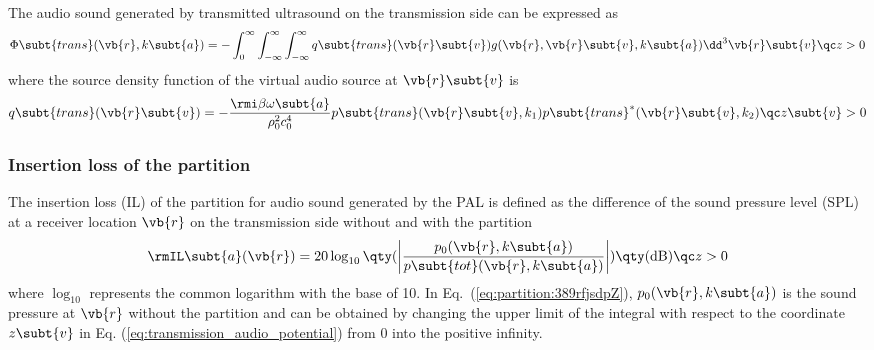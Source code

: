 The audio sound generated by transmitted ultrasound
on the transmission side can be expressed as
\begin{equation}
    \Phi\subt{trans}(\vb{r},k\subt{a})
    =-
    \int_0^\infty \int_{-\infty}^\infty \int_{-\infty}^\infty
    q\subt{trans}(\vb{r}\subt{v})
    g(\vb{r},\vb{r}\subt{v},k\subt{a})
    \dd^3 \vb{r}\subt{v}
    \qc
    z>0
    \label{eq:partition_trans_potential}
\end{equation}
where the source density function of the virtual audio source
at $\vb{r}\subt{v}$ is
\begin{equation}
    q\subt{trans}(\vb{r}\subt{v})
    = 
    -\frac{\rmi \beta \omega\subt{a}}{\rho_0^2c_0^4}
    p\subt{trans}(\vb{r}\subt{v},k_1)
    p\subt{trans}^*(\vb{r}\subt{v},k_2)
    \qc
    z\subt{v}>0
\end{equation}

\subsubsection{Insertion loss of the partition}
The insertion loss (IL) of the partition for audio sound
generated by the PAL is defined as the difference of the sound
pressure level (SPL) at a receiver location $\vb{r}$ on the transmission
side without and with the partition
\begin{equation}
    \rmIL\subt{a}(\vb{r}) = 
    20\log_{10} \qty(\left| \frac{p_0(\vb{r},k\subt{a})}{p\subt{tot}(\vb{r},k\subt{a})}\right|) \qty(\mathrm{dB})\qc
    z>0
    \label{eq:partition:389rfjsdpZ}
\end{equation}
where $\log_{10}$ represents the common logarithm with the base
of 10. 
In Eq.~(\ref{eq:partition:389rfjsdpZ}), $p_0(\vb{r},k\subt{a})$ is the sound pressure at $\vb{r}$ without
the partition and can be obtained by changing the upper
limit of the integral with respect to the coordinate $z\subt{v}$ in Eq.
(\ref{eq:transmission_audio_potential}) from 0 into the positive infinity.

